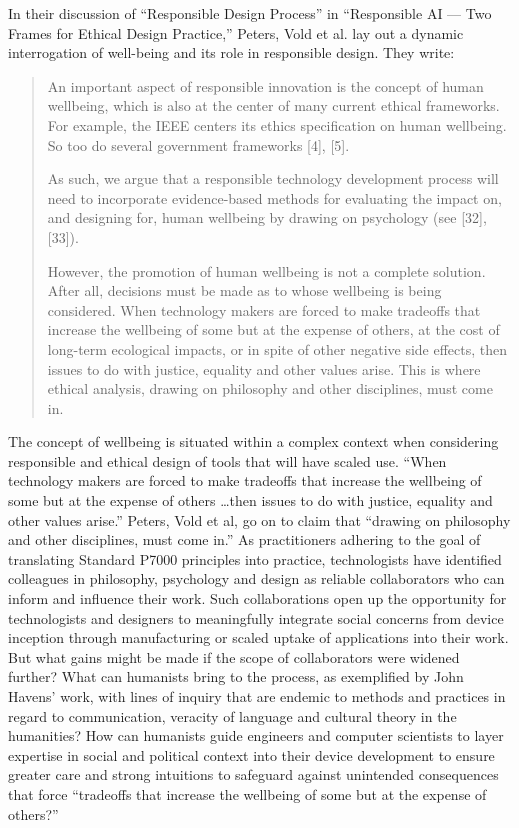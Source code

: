 \documentclass[11pt,dvipdfm]{article}
\begin{document}
In their discussion of ``Responsible Design Process'' in ``Responsible AI --– Two Frames for Ethical Design Practice,'' Peters, Vold et al. lay out a dynamic interrogation of well-being and its role in responsible design.  They write:
\begin{quote}
	An important aspect of responsible innovation is the concept of human wellbeing, which is also at the center of many current ethical frameworks.  For example, the IEEE centers its ethics specification on human wellbeing.  So too do several government frameworks [4], [5].
	
	As such, we argue that a responsible technology development process will need to incorporate evidence-based methods for evaluating the impact on, and designing for, human wellbeing by drawing on psychology (see [32], [33]).
	
	However, the promotion of human wellbeing is not a complete solution.  After all, decisions must be made as to whose wellbeing is being considered.  When technology makers are forced to make tradeoffs that increase the wellbeing of some but at the expense of others, at the cost of long-term ecological impacts, or in spite of other negative side effects, then issues to do with justice, equality and other values arise.  This is where ethical analysis, drawing on philosophy and other disciplines, must come in. 
	
\end{quote}
The concept of wellbeing is situated within a complex context when considering responsible and ethical design of tools that will have scaled use.  ``When technology makers are forced to make tradeoffs that increase the wellbeing of some but at the expense of others \ldots then issues to do with justice, equality and other values arise.''   Peters, Vold et al, go on to claim that ``drawing on philosophy and other disciplines, must come in.''   As practitioners adhering to the goal of translating Standard P7000 principles into practice, technologists have identified colleagues in philosophy, psychology and design as reliable collaborators who can inform and influence their work.  Such collaborations open up the opportunity for technologists and designers to meaningfully integrate social concerns from device inception through manufacturing or scaled uptake of applications into their work.  But what gains might be made if the scope of collaborators were widened further?  What can humanists bring to the process, as exemplified by John Havens’ work, with lines of inquiry that are endemic to methods and practices in regard to communication, veracity of language and cultural theory in the humanities?  How can humanists guide engineers and computer scientists to layer expertise in social and political context into their device development to ensure greater care and strong intuitions to safeguard against unintended consequences that force ``tradeoffs that increase the wellbeing of some but at the expense of others?''
\end{document}
